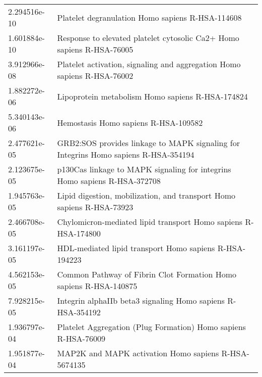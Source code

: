 \begin{longtable}{p{2.4cm}p{14.5cm}}
\bottomrule
\endlastfoot
             2.294516e-10 &                                                                          Platelet degranulation Homo sapiens R-HSA-114608 \\
             1.601884e-10 &                                                     Response to elevated platelet cytosolic Ca2+ Homo sapiens R-HSA-76005 \\
             3.912966e-08 &                                                   Platelet activation, signaling and aggregation Homo sapiens R-HSA-76002 \\
             1.882272e-06 &                                                                          Lipoprotein metabolism Homo sapiens R-HSA-174824 \\
             5.340143e-06 &                                                                                      Hemostasis Homo sapiens R-HSA-109582 \\
             2.477621e-05 &                                       GRB2:SOS provides linkage to MAPK signaling for Integrins Homo sapiens R-HSA-354194 \\
             2.123675e-05 &                                                 p130Cas linkage to MAPK signaling for integrins Homo sapiens R-HSA-372708 \\
             1.945763e-05 &                                                     Lipid digestion, mobilization, and transport Homo sapiens R-HSA-73923 \\
             2.466708e-05 &                                                            Chylomicron-mediated lipid transport Homo sapiens R-HSA-174800 \\
             3.161197e-05 &                                                                    HDL-mediated lipid transport Homo sapiens R-HSA-194223 \\
             4.562153e-05 &                                                         Common Pathway of Fibrin Clot Formation Homo sapiens R-HSA-140875 \\
             7.928215e-05 &                                                               Integrin alphaIIb beta3 signaling Homo sapiens R-HSA-354192 \\
             1.936797e-04 &                                                            Platelet Aggregation (Plug Formation) Homo sapiens R-HSA-76009 \\
             1.951877e-04 &                                                                      MAP2K and MAPK activation Homo sapiens R-HSA-5674135 \\

\end{longtable}
